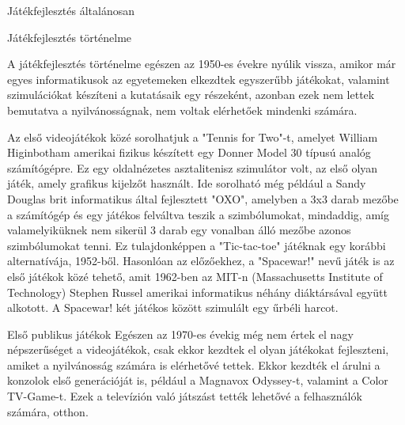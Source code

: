 \begin{MyChapter}{Játékfejlesztés általánosan}

	\begin{MySection}{Játékfejlesztés történelme}
		
		A játékfejlesztés történelme egészen az 1950-es évekre nyúlik vissza, amikor már egyes informatikusok az egyetemeken elkezdtek egyszerűbb játékokat, valamint szimulációkat készíteni a kutatásaik egy részeként, azonban ezek nem lettek bemutatva a nyilvánosságnak, nem voltak elérhetőek mindenki számára.
		
		Az első videojátékok közé sorolhatjuk a "Tennis for Two"-t, amelyet William Higinbotham amerikai fizikus készített egy Donner Model 30 típusú analóg számítógépre. Ez egy oldalnézetes asztalitenisz szimulátor volt, az első olyan játék, amely grafikus kijelzőt használt.
		Ide sorolható még például a Sandy Douglas brit informatikus által fejlesztett "OXO", amelyben a 3x3 darab mezőbe a számítógép és egy játékos felváltva teszik a szimbólumokat, mindaddig, amíg valamelyiküknek nem sikerül 3 darab egy vonalban álló mezőbe azonos szimbólumokat tenni. Ez tulajdonképpen a "Tic-tac-toe" játéknak egy korábbi alternatívája, 1952-ből.
		Hasonlóan az előzőekhez, a "Spacewar!" nevű játék is az első játékok közé tehető, amit 1962-ben az MIT-n (Massachusetts Institute of Technology) Stephen Russel amerikai informatikus néhány diáktársával együtt alkotott. A Spacewar! két játékos között szimulált egy űrbéli harcot.
		
		
		\begin{MySubSection}{Első publikus játékok}
		Egészen az 1970-es évekig még nem értek el nagy népszerűséget a videojátékok, csak ekkor kezdtek el olyan játékokat fejleszteni, amiket a nyilvánosság számára is elérhetővé tettek. Ekkor kezdték el árulni a konzolok első generációját is, például a Magnavox Odyssey-t, valamint a Color TV-Game-t. Ezek a televízión való játszást tették lehetővé a felhasználók számára, otthon.
		

\end{MySubSection}
\end{MySection}
\end{MyChapter}
